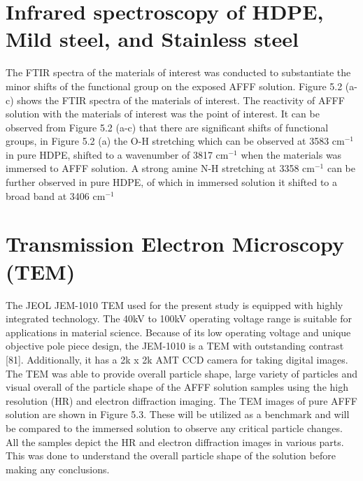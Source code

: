 \documentclass[12pt]{report}
\begin{document}

\section{Infrared spectroscopy of HDPE, Mild steel, and Stainless steel}  
The FTIR spectra of the materials of interest was conducted to substantiate the minor shifts of the functional group on the exposed AFFF solution. Figure 5.2 (a-c) shows the FTIR spectra of the materials of interest. The reactivity of AFFF solution with the materials of interest was the point of interest. It can be observed from Figure 5.2 (a-c) that there are significant shifts of functional groups, in Figure 5.2 (a) the O-H stretching which can be observed at 3583 cm$^{-1}$ in pure HDPE, shifted to a wavenumber of 3817 cm$^{-1}$ when the materials was immersed to AFFF solution. A strong amine N-H stretching at 3358 cm$^{-1}$ can be further observed in pure HDPE, of which in immersed solution it shifted to a broad band at 3406 cm$^{-1}$


\section{Transmission Electron Microscopy (TEM)}
The JEOL JEM-1010 TEM used for the present study is equipped with highly integrated technology. The 40kV to 100kV operating voltage range is suitable for applications in material science. Because of its low operating voltage and unique objective pole piece design, the JEM-1010 is a TEM with outstanding contrast [81]. Additionally, it has a 2k x 2k AMT CCD camera for taking digital images. The TEM was able to provide overall particle shape, large variety of particles and visual overall of the particle shape of the AFFF solution samples using the high resolution (HR) and electron diffraction imaging.  
The TEM images of pure AFFF solution are shown in Figure 5.3. These will be utilized as a benchmark and will be compared to the immersed solution to observe any critical particle changes. All the samples depict the HR and electron diffraction images in various parts. This was done to understand the overall particle shape of the solution before making any conclusions. 

\end{document}
